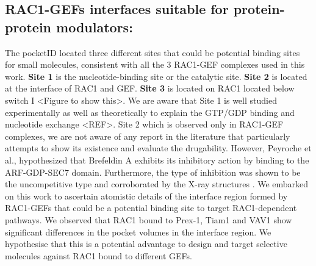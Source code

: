 \documentclass[12pt, a4paper]{achemso}
\begin{document}
\subsection{RAC1-GEFs interfaces suitable for protein-protein modulators:}

    The pocketID located three different sites that could be potential binding sites for small molecules, consistent with all the 3 RAC1-GEF complexes used in this work. \textbf{Site 1} is the nucleotide-binding site or the catalytic site. \textbf{Site 2} is located at the interface of RAC1 and GEF. \textbf{Site 3} is located on RAC1 located below switch I <Figure to show this>. We are aware that Site 1 is well studied experimentally as well as theoretically to explain the GTP/GDP binding and nucleotide exchange <REF>. Site 2 which is observed only in RAC1-GEF complexes, we are not aware of any report in the literature that particularly attempts to show its existence and evaluate the drugability. However, Peyroche et al.,\cite{peyroche1999brefeldin} hypothesized that Brefeldin A exhibits its inhibitory action by binding to the ARF-GDP-SEC7 domain. Furthermore, the type of inhibition was shown to be the uncompetitive type\cite{peyroche1999brefeldin,chardin1999brefeldin} and corroborated by the X-ray structures \cite{mossessova2003crystal,renault2003structural}. We embarked on this work to ascertain atomistic details of the interface region formed by RAC1-GEFs that could be a potential binding site to target RAC1-dependent pathways. We observed that RAC1 bound to Prex-1, Tiam1 and VAV1 show significant differences in the pocket volumes in the interface region. We hypothesise that this is a potential advantage to design and target selective molecules against RAC1 bound to different GEFs. 
    
\end{document}
